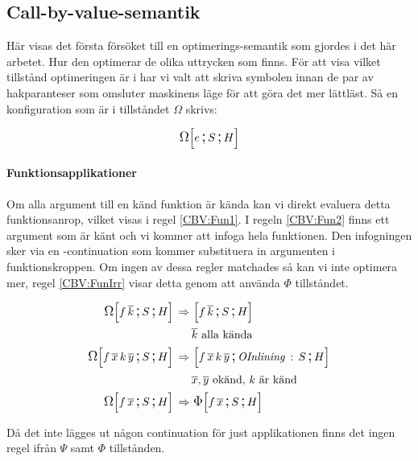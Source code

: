 \documentclass[../Optimise]{subfiles}
\begin{document}

\subsection{Call-by-value-semantik}
\label{sec:Optimise:CBV}

Här visas det första försöket till en optimerings-semantik som gjordes i det
här arbetet. Hur den optimerar de olika uttrycken som finns. 
För att visa vilket tillstånd optimeringen är i har vi valt att skriva symbolen
innan de par av hakparanteser som omsluter maskinens läge för att göra det mer
lättläst. Så en konfiguration som är i tillståndet $\Omega$ skrivs:

\[
\OMEGA SHe
\]




\paragraph{Funktionsapplikationer}
Om alla argument till en känd funktion är kända kan vi direkt evaluera detta funktionsanrop,
vilket visas i regel \eqref{CBV:Fun1}. I regeln \eqref{CBV:Fun2} finns ett argument som
är känt och vi kommer att infoga hela funktionen. Den infogningen sker via en -continuation
som kommer substituera in argumenten i funktionskroppen. Om ingen av dessa regler
matchades så kan vi inte optimera mer, regel \eqref{CBV:FunIrr} visar detta genom
att använda $\Phi$ tillståndet.

\begin{align}
\label{CBV:Fun1} \OMEGA SH{f\,\many{k}}  \rulesep &\, \mc{f\,\many{k}}SH\\
 & \many{k} \text{ alla kända} \nonumber \\
\label{CBV:Fun2} \OMEGA SH{f\,\many{x}\, k\,\many{y}}  \rulesep &\, \mc{f\,\many{x}\, k\,\many{y}}{\oInline S}H\\
 & \many{x},\many{y} \text{ okänd, } k \text{ är känd} \nonumber \\
\label{CBV:FunIrr} \OMEGA SH{f\,\many{x}} \rulesep &\, \IRR SH{f\,\many{x}}
\end{align}

Då det inte lägges ut någon continuation för just applikationen finns det ingen regel
ifrån $\Psi$ samt $\Phi$ tillstånden.
\end{document}

